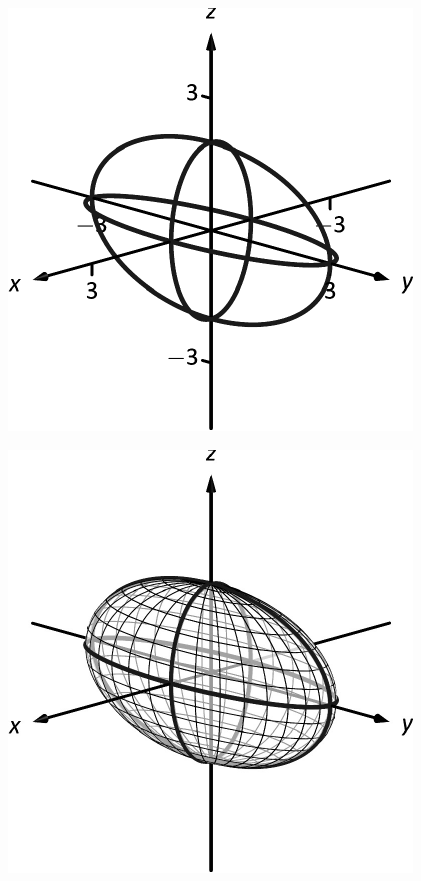 \documentclass[10pt]{article}
\begin{document}
\includegraphics{figspace5b_3DBW.pdf}
\texttt{}

\includegraphics{figspace5bb_3DBW.pdf}
\texttt{}
\end{document}
